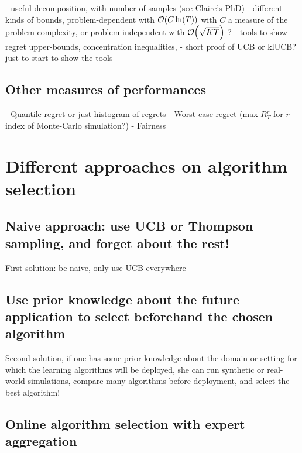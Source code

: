- useful decomposition, with number of samples (see Claire's PhD)
- different kinds of bounds, problem-dependent with $\mathop{}\mathopen{}\mathcal{O}\mathopen{}\left(C \ln(T)\right)$ with $C$ a measure of the problem complexity, or problem-independent with $\mathop{}\mathopen{}\mathcal{O}\mathopen{}\left(\sqrt{KT}\right)$ ?
- tools to show regret upper-bounds, concentration inequalities,
- short proof of UCB or klUCB? just to start to show the tools


\subsection{Other measures of performances}

- Quantile regret or just histogram of regrets
- Worst case regret (max $R_T^{r}$ for $r$ index of Monte-Carlo simulation?)
- Fairness


\section{Different approaches on algorithm selection}
\label{sec:2:chooseYourPreferredBanditAlgorithm}

\subsection{Naive approach: use UCB or Thompson sampling, and forget about the rest!}
First solution: be naive, only use UCB everywhere

\subsection{Use prior knowledge about the future application to select beforehand the chosen algorithm}
Second solution, if one has some prior knowledge about the domain or setting for which the learning algorithms will be deployed, she can run synthetic or real-world simulations, compare many algorithms before deployment, and select the best algorithm!

\subsection{Online algorithm selection with expert aggregation}






